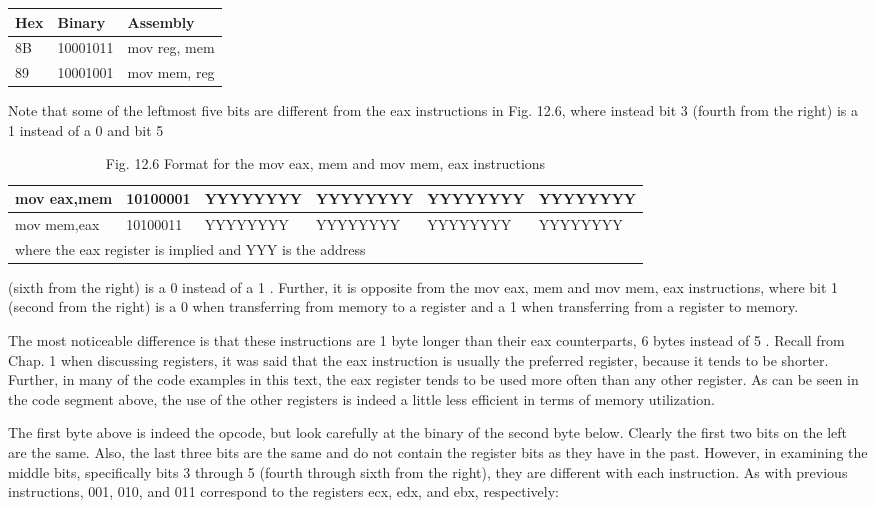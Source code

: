 \documentclass[10pt]{article}
\begin{document}
\begin{center}
\begin{tabular}{|l|l|l|}
\hline
Hex & Binary & Assembly \\
\hline
8B & 10001011 & mov reg, mem \\
\hline
89 & 10001001 & mov mem, reg \\
\hline
\end{tabular}
\end{center}

Note that some of the leftmost five bits are different from the eax instructions in Fig. 12.6, where instead bit 3 (fourth from the right) is a 1 instead of a 0 and bit 5

\begin{table}[h]
\begin{center}
\begin{tabular}{|l|l|l|l|l|l|}
\hline
mov eax,mem & 10100001 & YYYYYYYY & YYYYYYYY & YYYYYYYY & YYYYYYYY \\
\hline
mov mem,eax & 10100011 & YYYYYYYY & YYYYYYYY & YYYYYYYY & YYYYYYYY \\
\hline
\multicolumn{6}{|l|}{where the eax register is implied and YYY is the address} \\
\hline
\end{tabular}
\captionsetup{labelformat=empty}
\caption{Fig. 12.6 Format for the mov eax, mem and mov mem, eax instructions}
\end{center}
\end{table}

(sixth from the right) is a 0 instead of a 1 . Further, it is opposite from the mov eax, mem and mov mem, eax instructions, where bit 1 (second from the right) is a 0 when transferring from memory to a register and a 1 when transferring from a register to memory.

The most noticeable difference is that these instructions are 1 byte longer than their eax counterparts, 6 bytes instead of 5 . Recall from Chap. 1 when discussing registers, it was said that the eax instruction is usually the preferred register, because it tends to be shorter. Further, in many of the code examples in this text, the eax register tends to be used more often than any other register. As can be seen in the code segment above, the use of the other registers is indeed a little less efficient in terms of memory utilization.

The first byte above is indeed the opcode, but look carefully at the binary of the second byte below. Clearly the first two bits on the left are the same. Also, the last three bits are the same and do not contain the register bits as they have in the past. However, in examining the middle bits, specifically bits 3 through 5 (fourth through sixth from the right), they are different with each instruction. As with previous instructions, 001, 010, and 011 correspond to the registers ecx, edx, and ebx, respectively:
\end{document}
